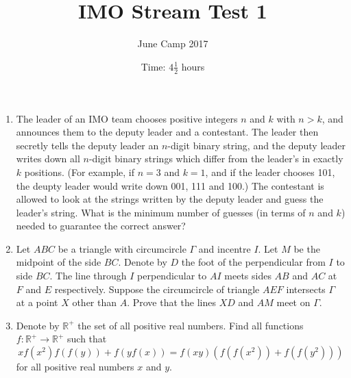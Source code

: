 \documentclass{article}
\title{IMO Stream Test 1}
\author{June Camp 2017}
\date{Time: $4\frac{1}{2}$ hours}
\begin{document}
 \maketitle

\begin{enumerate}

\item %
	The leader of an IMO team chooses positive integers $n$ and $k$ with $n>k$, and announces them to the deputy leader and a contestant. The leader then secretly tells the deputy leader an $n$-digit binary string, and the deputy leader writes down all $n$-digit binary strings which differ from the leader's in exactly $k$ positions. (For example, if $n=3$ and $k=1$, and if the leader chooses 101, the deupty leader would write down 001, 111 and 100.) The contestant is allowed to look at the strings written by the deputy leader and guess the leader's string. What is the minimum number of guesses (in terms of $n$ and $k$) needed to guarantee the correct answer?

\item %
	Let $ABC$ be a triangle with circumcircle $\Gamma$ and incentre $I$. Let $M$ be the midpoint of the side $BC$. Denote by $D$ the foot of the perpendicular from $I$ to side $BC$. The line through $I$ perpendicular to $AI$ meets sides $AB$ and $AC$ at $F$ and $E$ respectively. Suppose the circumcircle of triangle $AEF$ intersects $\Gamma$ at a point $X$ other than $A$. Prove that the lines $XD$ and $AM$ meet on $\Gamma$.

\item %
	Denote by $\mathbb{R}^+$ the set of all positive real numbers. Find all functions $f:\mathbb{R}^+\to\mathbb{R}^+$ such that \[xf(x^2)f(f(y)) +f(yf(x)) =f(xy)\left(f(f(x^2))+f(f(y^2))\right)\] for all positive real numbers $x$ and $y$.

\end{enumerate}
\end{document}
